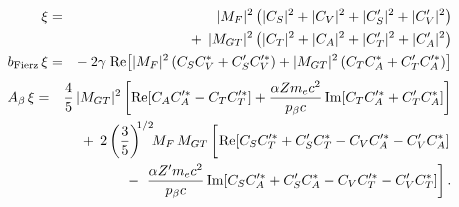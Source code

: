 %
%
%
\begin{eqnarray}
    \xi &=& 
    	|M_F|^2    \left( |C_S|^2 + |C_V|^2 + |C_S^\prime|^2 + |C_V^\prime|^2 \right) 
		\nonumber \\ && + \;\,
		|M_{GT}|^2 \left( |C_T|^2 + |C_A|^2 + |C_T^\prime|^2 + |C_A^\prime|^2 \right)
		\label{eq:jtw_xi_integrated_intro} \\
    \bFierz \, \xi &=& 
    	- \: 2 \gamma \;
		\textrm{Re}\!\left[ |M_F|^2 \left( C_S C_V^* + C_S^\prime C_V^{\prime *} \right) 
    	+ |M_{GT}|^2 \left( C_T C_A^* + C_T^{\prime} C_A^{\prime *} \right) \right] 
		\nonumber \\
    	\label{eq:jtw_bxi_integrated_intro} %
\end{eqnarray}
\begin{eqnarray}
    \Abeta \, \xi &=& 
    	\frac{4}{5} \, |M_{GT}|^2 \left[ \textrm{Re}\!\left[ C_A C_A^{\prime *} - C_T C_T^{\prime *} \right] + \frac{\alpha Z \me c^2}{\pbeta c} \,\textrm{Im}\!\left[ C_T C_A^{\prime *} + C_T^\prime C_A^* \right] \right] 
		\nonumber \\ && + \;\, 
		2
		\left( \frac{3}{5} \right)^{\!\! 1/2} \!\!
		M_F\,M_{GT}  \left[ \phantom{\frac{1}{1}\!\!\!\!} \textrm{Re} \! \left[ C_S C_T^{\prime *} +  C_S^\prime C_T^* - C_V C_A^{\prime *} - C_V^\prime C_A^* \right] 
		\right.
		\nonumber \\ && - \;
		\left.
		\frac{\alpha Z^\prime \me c^2}{\pbeta c} \,\textrm{Im}\!\left[ C_S C_A^{\prime *} + C_S^\prime C_A^* - C_V C_T^{\prime *} -C_V^\prime C_T^* \right] \right].
	\label{eq:jtw_Abetaxi_integrated_intro}
\end{eqnarray}
%
%